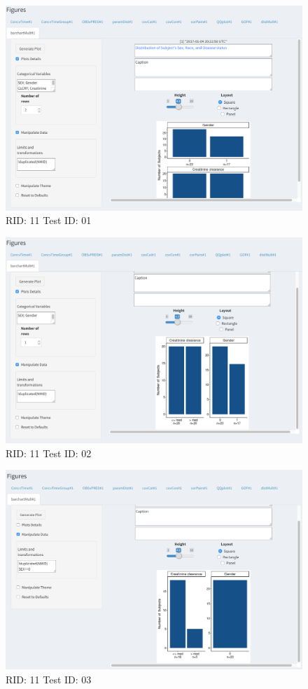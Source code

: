 \begin{figure}[H]
\includegraphics[width=.8\textwidth]{screencaps/11-01-1.png}
\caption{RID: 11 Test ID: 01}
\end{figure}
\begin{figure}[H]
\includegraphics[width=.8\textwidth]{screencaps/11-02-1.png}
\caption{RID: 11 Test ID: 02}
\end{figure}
\begin{figure}[H]
\includegraphics[width=.8\textwidth]{screencaps/11-03-1.png}
\caption{RID: 11 Test ID: 03}
\end{figure}
